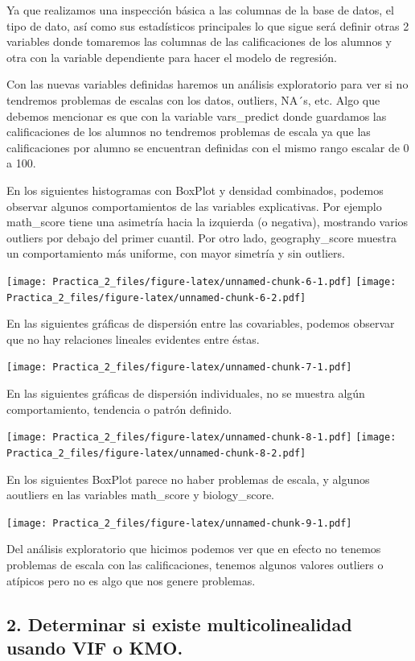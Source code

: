 \documentclass[
]{article}
\begin{document}
Ya que realizamos una inspección básica a las columnas de la base de
datos, el tipo de dato, así como sus estadísticos principales lo que
sigue será definir otras 2 variables donde tomaremos las columnas de las
calificaciones de los alumnos y otra con la variable dependiente para
hacer el modelo de regresión.

Con las nuevas variables definidas haremos un análisis exploratorio para
ver si no tendremos problemas de escalas con los datos, outliers, NA´s,
etc. Algo que debemos mencionar es que con la variable vars\_predict
donde guardamos las calificaciones de los alumnos no tendremos problemas
de escala ya que las calificaciones por alumno se encuentran definidas
con el mismo rango escalar de 0 a 100.

En los siguientes histogramas con BoxPlot y densidad combinados, podemos
observar algunos comportamientos de las variables explicativas. Por
ejemplo math\_score tiene una asimetría hacia la izquierda (o negativa),
mostrando varios outliers por debajo del primer cuantil. Por otro lado,
geography\_score muestra un comportamiento más uniforme, con mayor
simetría y sin outliers.

\texttt{[image: Practica\_2\_files/figure-latex/unnamed-chunk-6-1.pdf]}
\texttt{[image: Practica\_2\_files/figure-latex/unnamed-chunk-6-2.pdf]}

En las siguientes gráficas de dispersión entre las covariables, podemos
observar que no hay relaciones lineales evidentes entre éstas.

\texttt{[image: Practica\_2\_files/figure-latex/unnamed-chunk-7-1.pdf]}

En las siguientes gráficas de dispersión individuales, no se muestra
algún comportamiento, tendencia o patrón definido.

\texttt{[image: Practica\_2\_files/figure-latex/unnamed-chunk-8-1.pdf]}
\texttt{[image: Practica\_2\_files/figure-latex/unnamed-chunk-8-2.pdf]}

En los siguientes BoxPlot parece no haber problemas de escala, y algunos
aoutliers en las variables math\_score y biology\_score.

\texttt{[image: Practica\_2\_files/figure-latex/unnamed-chunk-9-1.pdf]}

Del análisis exploratorio que hicimos podemos ver que en efecto no
tenemos problemas de escala con las calificaciones, tenemos algunos
valores outliers o atípicos pero no es algo que nos genere problemas.

\hypertarget{determinar-si-existe-multicolinealidad-usando-vif-o-kmo.}{%
\subsection{2. Determinar si existe multicolinealidad usando VIF o
KMO.}\label{determinar-si-existe-multicolinealidad-usando-vif-o-kmo.}}
\end{document}
